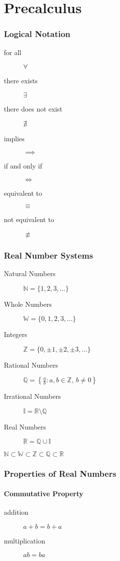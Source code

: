 \part{Precalculus}

\section{Logical Notation}
\begin{description}
    \item[for all] $\forall$
    \item[there exists] $\exists$
    \item[there does not exist] $\nexists$
    \item[implies] $\implies$
    \item[if and only if] $\iff$
    \item[equivalent to] $\equiv$
    \item[not equivalent to] $\not\equiv$
\end{description}

\section{Real Number Systems}
\begin{description}
    \item[Natural Numbers] $\mathbb{N} = \{1,2,3,\dots\}$
    \item[Whole Numbers] $\mathbb{W} = \{0,1,2,3,\dots\}$
    \item[Integers] $\mathbb{Z} = \{0,\pm1,\pm2,\pm3,\dots\}$
    \item[Rational Numbers] $\mathbb{Q} = \left\{\frac{a}{b} : a,b \in \mathbb{Z},\, b \neq 0 \right\}$
    \item[Irrational Numbers] $\mathbb{I} = \mathbb{R} \setminus \mathbb{Q}$
    \item[Real Numbers] $\mathbb{R} = \mathbb{Q} \cup \mathbb{I}$
\end{description}

$\mathbb{N} \subset \mathbb{W} \subset \mathbb{Z} \subset \mathbb{Q} \subset \mathbb{R}$

\section{Properties of Real Numbers}

\subsection{Commutative Property}
\begin{description}
    \item[addition] $a + b = b + a$
    \item[multiplication] $ab = ba$
\end{description}

